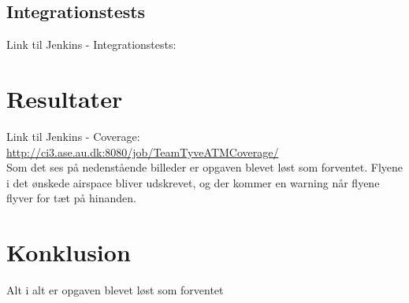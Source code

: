 \subsection{Integrationstests}
Link til Jenkins - Integrationstests: \newline \newline

\section{Resultater}
Link til Jenkins - Coverage: \url{http://ci3.ase.au.dk:8080/job/TeamTyveATMCoverage/} \\
Som det ses på nedenstående billeder er opgaven blevet løst som forventet. Flyene i det ønskede airspace bliver udskrevet, og der kommer en warning når flyene flyver for tæt på hinanden.


\section{Konklusion}
Alt i alt er opgaven blevet løst som forventet

